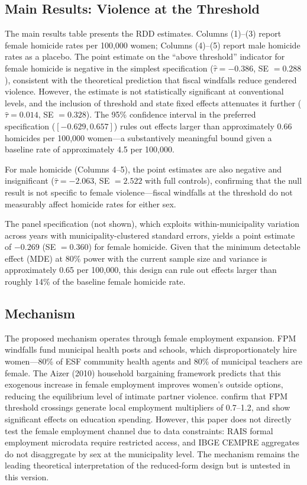 \documentclass[12pt]{article}
\begin{document}
\subsection{Main Results: Violence at the Threshold}



The main results table presents the RDD estimates. Columns (1)--(3) report female homicide rates per 100,000 women; Columns (4)--(5) report male homicide rates as a placebo. The point estimate on the ``above threshold'' indicator for female homicide is negative in the simplest specification ($\hat{\tau} = -0.386$, SE $= 0.288$), consistent with the theoretical prediction that fiscal windfalls reduce gendered violence. However, the estimate is not statistically significant at conventional levels, and the inclusion of threshold and state fixed effects attenuates it further ($\hat{\tau} = 0.014$, SE $= 0.328$). The 95\% confidence interval in the preferred specification ($[-0.629, 0.657]$) rules out effects larger than approximately 0.66 homicides per 100,000 women---a substantively meaningful bound given a baseline rate of approximately 4.5 per 100,000.

For male homicide (Columns 4--5), the point estimates are also negative and insignificant ($\hat{\tau} = -2.063$, SE $= 2.522$ with full controls), confirming that the null result is not specific to female violence---fiscal windfalls at the threshold do not measurably affect homicide rates for either sex.

The panel specification (not shown), which exploits within-municipality variation across years with municipality-clustered standard errors, yields a point estimate of $-0.269$ (SE $= 0.360$) for female homicide. Given that the minimum detectable effect (MDE) at 80\% power with the current sample size and variance is approximately 0.65 per 100,000, this design can rule out effects larger than roughly 14\% of the baseline female homicide rate.

\subsection{Mechanism}

The proposed mechanism operates through female employment expansion. FPM windfalls fund municipal health posts and schools, which disproportionately hire women---80\% of ESF community health agents and 80\% of municipal teachers are female. The Aizer (2010) household bargaining framework predicts that this exogenous increase in female employment improves women's outside options, reducing the equilibrium level of intimate partner violence. \citet{corbi2019fiscal} confirm that FPM threshold crossings generate local employment multipliers of 0.7--1.2, and \citet{litschig2013impact} show significant effects on education spending. However, this paper does not directly test the female employment channel due to data constraints: RAIS formal employment microdata require restricted access, and IBGE CEMPRE aggregates do not disaggregate by sex at the municipality level. The mechanism remains the leading theoretical interpretation of the reduced-form design but is untested in this version.
\end{document}
